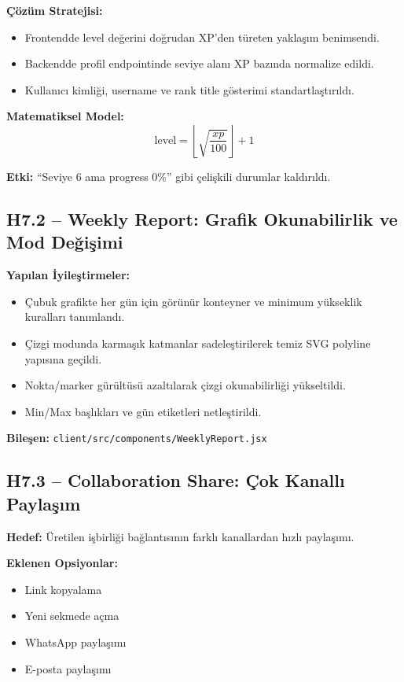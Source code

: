 \documentclass[12pt,a4paper]{article}
\begin{document}
\textbf{Çözüm Stratejisi:}
\begin{itemize}[leftmargin=*]
  \item Frontendde level değerini doğrudan XP'den türeten yaklaşım benimsendi.
  \item Backendde profil endpointinde seviye alanı XP bazında normalize edildi.
  \item Kullanıcı kimliği, username ve rank title gösterimi standartlaştırıldı.
\end{itemize}

\textbf{Matematiksel Model:}
$$
\text{level} = \left\lfloor\sqrt{\frac{xp}{100}}\right\rfloor + 1
$$

\textbf{Etki:} ``Seviye 6 ama progress 0\%'' gibi çelişkili durumlar kaldırıldı.

\subsection{H7.2 -- Weekly Report: Grafik Okunabilirlik ve Mod Değişimi}

\textbf{Yapılan İyileştirmeler:}
\begin{itemize}[leftmargin=*]
  \item Çubuk grafikte her gün için görünür konteyner ve minimum yükseklik kuralları tanımlandı.
  \item Çizgi modunda karmaşık katmanlar sadeleştirilerek temiz SVG polyline yapısına geçildi.
  \item Nokta/marker gürültüsü azaltılarak çizgi okunabilirliği yükseltildi.
  \item Min/Max başlıkları ve gün etiketleri netleştirildi.
\end{itemize}

\textbf{Bileşen:} \texttt{client/src/components/WeeklyReport.jsx}

\subsection{H7.3 -- Collaboration Share: Çok Kanallı Paylaşım}

\textbf{Hedef:} Üretilen işbirliği bağlantısının farklı kanallardan hızlı paylaşımı.

\textbf{Eklenen Opsiyonlar:}
\begin{itemize}[leftmargin=*]
  \item Link kopyalama
  \item Yeni sekmede açma
  \item WhatsApp paylaşımı
  \item E-posta paylaşımı
\end{itemize}
\end{document}
